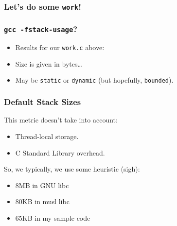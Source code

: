 \begin{frame}[fragile]

\frametitle{Let's do some \texttt{work}!}

\footnotesize



\end{frame}


\begin{frame}[fragile]

\frametitle{\texttt{gcc -fstack-usage}?}



\begin{itemize}

\item Results for our \texttt{work.c} above:



\item Size is given in bytes\ldots

\item May be \texttt{static} or \texttt{dynamic} (but hopefully,
\texttt{bounded}).

\end{itemize}

\vspace{\fill}

\end{frame}


\begin{frame}

\frametitle{Default Stack Sizes}

\vspace{\fill}

This metric doesn't take into account:

\begin{itemize}

\item Thread-local storage.

\item C Standard Library overhead.

\end{itemize}

\vspace{\fill}

So, we typically, we use some heuristic (sigh):

\begin{itemize}

\item 8MB in GNU libc

\item 80KB in musl libc

\item 65KB in my sample code



\end{itemize}

\vspace{\fill}

\end{frame}


